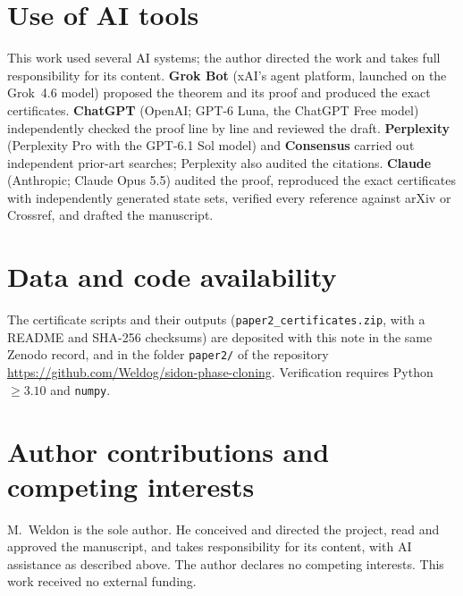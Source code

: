 \documentclass[11pt]{article}
\theoremstyle{definition}
\theoremstyle{remark}
\begin{document}
\section*{Use of AI tools}
This work used several AI systems; the author directed the work and takes full responsibility for its content.
\textbf{Grok Bot} (xAI's agent platform, launched on the Grok~4.6 model) proposed the theorem and its proof and
produced the exact certificates. \textbf{ChatGPT} (OpenAI; GPT-6 Luna, the ChatGPT Free model) independently checked the proof line by line and
reviewed the draft.
\textbf{Perplexity} (Perplexity Pro with the GPT-6.1 Sol model) and \textbf{Consensus} carried out independent
prior-art searches; Perplexity also audited the citations. \textbf{Claude} (Anthropic; Claude Opus 5.5) audited the proof, reproduced the exact certificates
with independently generated state sets, verified every reference against arXiv or Crossref, and drafted the
manuscript.

\section*{Data and code availability}
The certificate scripts and their outputs (\texttt{paper2\_certificates.zip}, with a README and SHA-256 checksums) are
deposited with this note in the same Zenodo record, and in the folder \texttt{paper2/} of the repository
\url{https://github.com/Weldog/sidon-phase-cloning}. Verification requires Python $\ge3.10$ and \texttt{numpy}.

\section*{Author contributions and competing interests}
M.~Weldon is the sole author. He conceived and directed the project, read and approved the manuscript, and takes
responsibility for its content, with AI assistance as described above. The author declares no competing interests.
This work received no external funding.



\end{document}

